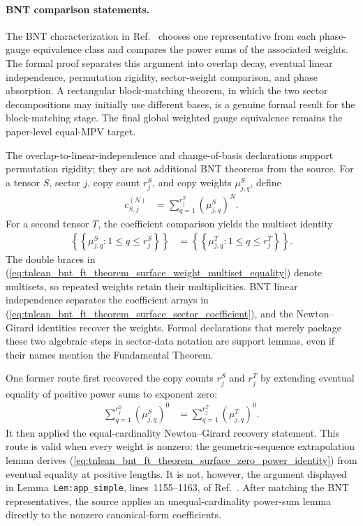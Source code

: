 \documentclass{article}
\begin{document}
\paragraph{BNT comparison statements.}
The BNT characterization in Ref.~\cite{Cirac2016MPDO_arXiv} chooses one
representative from each phase-gauge equivalence class and compares the power
sums of the associated weights. The formal proof separates this argument into
overlap decay, eventual linear independence, permutation rigidity,
sector-weight comparison, and phase absorption. A rectangular block-matching
theorem, in which the two sector decompositions may initially use different
bases, is a genuine formal result for the block-matching stage. The final
global weighted gauge equivalence remains the paper-level equal-MPV target.

The overlap-to-linear-independence and change-of-basis declarations support
permutation rigidity; they are not additional BNT theorems from the source.
For a tensor $S$, sector $j$, copy count $r_j^S$, and copy weights
$\mu_{j,q}^S$, define
\begin{align}
    c_{S,j}^{(N)}
        &=
        \sum_{q=1}^{r_j^S}
        (\mu_{j,q}^S)^N.
    \label{eq:tnlean_bnt_ft_theorem_surface_sector_coefficient}
\end{align}
For a second tensor $T$, the coefficient comparison yields the multiset
identity
\begin{align}
    \left\{\!\left\{\mu_{j,q}^S:1\leq q\leq r_j^S\right\}\!\right\}
        &=
        \left\{\!\left\{\mu_{j,q}^T:1\leq q\leq r_j^T\right\}\!\right\}.
    \label{eq:tnlean_bnt_ft_theorem_surface_weight_multiset_equality}
\end{align}
The double braces in
(\ref{eq:tnlean_bnt_ft_theorem_surface_weight_multiset_equality}) denote
multisets, so repeated weights retain their multiplicities. BNT linear
independence separates the coefficient arrays in
(\ref{eq:tnlean_bnt_ft_theorem_surface_sector_coefficient}), and the
Newton--Girard identities recover the weights. Formal declarations that merely
package these two algebraic steps in sector-data notation are support lemmas,
even if their names mention the Fundamental Theorem.

One former route first recovered the copy counts $r_j^S$ and $r_j^T$ by
extending eventual equality of positive power sums to exponent zero:
\begin{align}
    \sum_{q=1}^{r_j^S}
        (\mu_{j,q}^S)^0
        &=
        \sum_{q=1}^{r_j^T}
        (\mu_{j,q}^T)^0.
    \label{eq:tnlean_bnt_ft_theorem_surface_zero_power_identity}
\end{align}
It then applied the equal-cardinality Newton--Girard recovery statement. This
route is valid when every weight is nonzero: the geometric-sequence
extrapolation lemma derives
(\ref{eq:tnlean_bnt_ft_theorem_surface_zero_power_identity}) from eventual
equality at positive lengths. It is not, however, the argument displayed in
Lemma~\texttt{Lem:app\_simple}, lines~1155--1163, of
Ref.~\cite{Cirac2016MPDO_arXiv}. After matching the BNT representatives, the
source applies an unequal-cardinality power-sum lemma directly to the nonzero
canonical-form coefficients.
\end{document}
